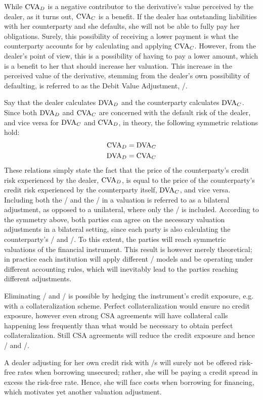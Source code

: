 \documentclass[main.tex]{subfiles}
\begin{document}
        While $\CVA/_{D}$ is a negative contributor to the derivative's value perceived by the dealer, 
        as it turns out, $\CVA/_{C}$ is a benefit.
        If the dealer has outstanding liabilities with her counterparty
        and she defaults, she will not be able to fully pay her obligations. 
        Surely, this possibility of receiving a lower payment is what the counterparty accounts for 
        by calculating and applying $\CVA/_{C}$.
        However, from the dealer's point of view, this is a possibility of having to pay a lower amount,
        which is a benefit to her that should increase her valuation.
        This increase in the perceived value of the derivative,
        stemming from the dealer's own possibility of defaulting, 
        is referred to as the Debit Value Adjustment, \DVA/.

        Say that the dealer calculates $\DVA/_{D}$ and the counterparty calculates $\DVA/_{C}$.
        Since both $\DVA/_{D}$ and $\CVA/_{C}$ are concerned with the default risk of the dealer,
        and vice versa for $\DVA/_{C}$ and $\CVA/_{D}$, in theory, the following symmetric relations hold:
            \begin{align*}
                \CVA/_{D} &= \DVA/_{C} \\
                \DVA/_{D} &= \CVA/_{C}
            \end{align*}
        These relations simply state the fact that
        the price of the counterparty's credit risk experienced by the dealer, $\CVA/_{D}$,
        is equal to the price of the counterparty's credit risk 
        experienced by the counterparty itself, $\DVA/_{C}$, and vice versa.
        Including both the \CVA/ and the \DVA/ in a valuation is referred to as a bilateral adjustment,
        as opposed to a unilateral, where only the \CVA/ is included.
        According to the symmetry above,
        both parties can agree on the necessary valuation adjustments in a bilateral setting,
        since each party is also calculating the counterparty's \CVA/ and \DVA/.
        To this extent, the parties will reach symmetric valuations of the financial instrument. 
        This result is however merely theoretical; 
        in practice each institution will apply different \CVA/ models
        and be operating under different accounting rules, 
        which will inevitably lead to the parties reaching different adjustments. 
        
        Eliminating \CVA/ and \DVA/ is possible by hedging the instrument's credit exposure,
        e.g. with a collateralization scheme. 
        Perfect collateralization would ensure no credit exposure,
        however even strong CSA agreements will have collateral calls happening less frequently
        than what would be necessary to obtain perfect collateralization.
        Still CSA agreements will reduce the credit exposure and hence \CVA/ and \DVA/.

        A dealer adjusting for her own credit risk with \DVA/s
        will surely not be offered risk-free rates when borrowing unsecured;
        rather, she will be paying a credit spread in excess the risk-free rate.
        Hence, she will face costs when borrowing for financing,
        which motivates yet another valuation adjustment.
\end{document}

